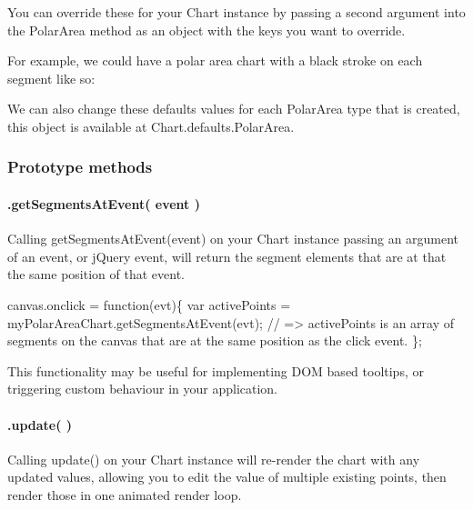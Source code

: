 You can override these for your {\ttfamily Chart} instance by passing a second argument into the {\ttfamily Polar\+Area} method as an object with the keys you want to override.

For example, we could have a polar area chart with a black stroke on each segment like so\+:




We can also change these defaults values for each Polar\+Area type that is created, this object is available at {\ttfamily Chart.\+defaults.\+Polar\+Area}.

\subsubsection*{Prototype methods}

\paragraph*{.get\+Segments\+At\+Event( event )}

Calling {\ttfamily get\+Segments\+At\+Event(event)} on your Chart instance passing an argument of an event, or j\+Query event, will return the segment elements that are at that the same position of that event.


\begin{DoxyCode}
canvas.onclick = function(evt)\{
    var activePoints = myPolarAreaChart.getSegmentsAtEvent(evt);
    // => activePoints is an array of segments on the canvas that are at the same position as the click
       event.
\};
\end{DoxyCode}


This functionality may be useful for implementing D\+OM based tooltips, or triggering custom behaviour in your application.

\paragraph*{.update( )}

Calling {\ttfamily update()} on your Chart instance will re-\/render the chart with any updated values, allowing you to edit the value of multiple existing points, then render those in one animated render loop.


